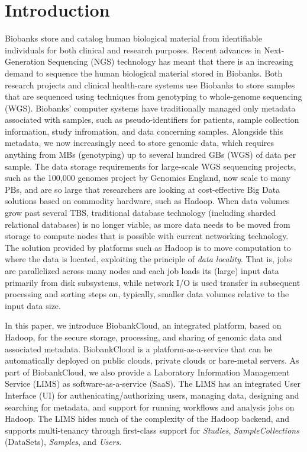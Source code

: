 \section{Introduction}
Biobanks store and catalog human biological material from identifiable individuals for both clinical and research purposes. Recent advances in Next-Generation Sequencing (NGS) technology has meant that there is an increasing demand to sequence the human biological material stored in Biobanks. Both research projects and clinical health-care systems use Biobanks to store samples that are sequenced using techniques from genotyping to whole-genome sequencing (WGS). Biobanks' computer systems have traditionally managed only metadata associated with samples, such as pseudo-identifiers for patients, sample collection information, study infromation, and data concerning samples. Alongside this metadata, we now increasingly need to store genomic data, which requires anything from MBs (genotyping) up to several hundred GBs (WGS) of data per sample.
The data storage requirements for large-scale WGS sequencing projects, such as the 100,000 genomes project by Genomics England, now scale to many PBs, and are so large that researchers are looking at cost-effective Big Data solutions based on commodity hardware, such as Hadoop. When data volumes grow past several TBS, traditional database technology (including sharded relational databases) is no longer viable, as more data needs to be moved from storage to compute nodes that is possible with current networking technology. The solution provided by platforms such as Hadoop is to move computation to where the data is located, exploiting the principle of \textit{data locality}. That is, jobs are parallelized across many nodes and each job loads its (large) input data primarily from disk subsystems, while network I/O is used transfer in subsequent processing and sorting steps on, typically, smaller data volumes relative to the input data size.

In this paper, we introduce BiobankCloud, an integrated platform, based on Hadoop, for the secure storage, processing, and sharing of genomic data and associated metadata. BiobankCloud is a platform-as-a-service that can be automatically deployed on public clouds, private clouds or bare-metal servers. As part of BiobankCloud, we also provide a Laboratory Information Management Service (LIMS) as software-as-a-service (SaaS). The LIMS has an integrated User Interface (UI) for authenicating/authorizing users, managing data, designing and searching for metadata, and support for running workflows and analysis jobs on Hadoop. The LIMS hides much of the complexity of the Hadoop backend, and supports multi-tenancy through first-class support for \textit{Studies}, \textit{SampleCollections} (DataSets), \textit{Samples}, and \textit{Users}.

